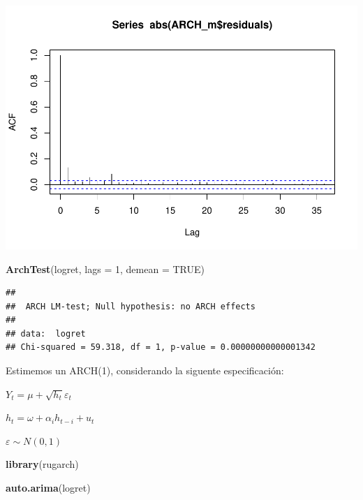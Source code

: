 \documentclass[
]{book}
\newenvironment{Shaded}{\begin{snugshade}}{\end{snugshade}}
\newcommand{\AttributeTok}[1]{\textcolor[rgb]{0.13,0.29,0.53}{#1}}
\newcommand{\ConstantTok}[1]{\textcolor[rgb]{0.56,0.35,0.01}{#1}}
\newcommand{\DecValTok}[1]{\textcolor[rgb]{0.00,0.00,0.81}{#1}}
\newcommand{\FunctionTok}[1]{\textcolor[rgb]{0.13,0.29,0.53}{\textbf{#1}}}
\newcommand{\NormalTok}[1]{#1}
\newcommand{\SpecialCharTok}[1]{\textcolor[rgb]{0.81,0.36,0.00}{\textbf{#1}}}
\begin{document}
\begin{Shaded}
\end{Shaded}

\includegraphics{Notas-Series-Tiempo_files/figure-latex/ArchTest-2.pdf}

\begin{Shaded}
\begin{Highlighting}[]
\FunctionTok{ArchTest}\NormalTok{(logret, }\AttributeTok{lags =} \DecValTok{1}\NormalTok{, }\AttributeTok{demean =} \ConstantTok{TRUE}\NormalTok{)}
\end{Highlighting}
\end{Shaded}

\begin{verbatim}
## 
##  ARCH LM-test; Null hypothesis: no ARCH effects
## 
## data:  logret
## Chi-squared = 59.318, df = 1, p-value = 0.00000000000001342
\end{verbatim}

Estimemos un ARCH(1), considerando la siguente especificación:

\(Y_t = \mu+\sqrt{h_t}\varepsilon_t\)

\(h_t = \omega+\alpha_ih_{t-i}+u_t\)

\(\varepsilon \sim N(0,1)\)

\begin{Shaded}
\begin{Highlighting}[]
\FunctionTok{library}\NormalTok{(rugarch)}

\FunctionTok{auto.arima}\NormalTok{(logret)}
\end{Highlighting}
\end{Shaded}
\end{document}
